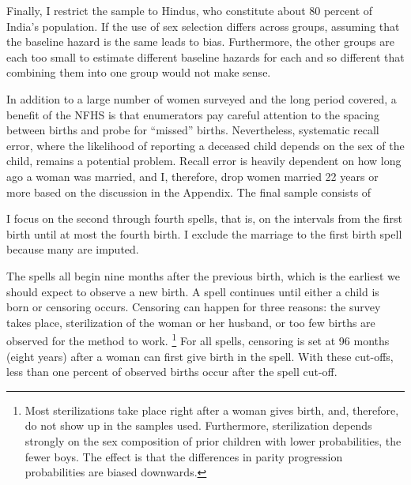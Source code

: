 \documentclass[12pt,letterpaper]{article}
\begin{document}
Finally, I restrict the sample to Hindus, who constitute about 80 percent of India’s 
population.
If the use of sex selection differs across groups, assuming that the
baseline hazard is the same leads to bias. 
Furthermore, the other groups are each too small to estimate different
baseline hazards for each and so different that combining them into one
group would not make sense.


In addition to a large number of women surveyed and the long period covered, a
benefit of the NFHS is that enumerators pay careful attention to the spacing 
between births and probe for ``missed'' births.
Nevertheless, systematic recall error, where the likelihood of reporting a deceased 
child depends on the sex of the child, remains a potential problem.
Recall error is heavily dependent on how long ago a woman was married, and I, therefore, 
drop women married 22 years or more based on the discussion in the Appendix.
The final sample consists of 



I focus on the second through fourth spells, that is, on the intervals from the first 
birth until at most the fourth birth.
I exclude the marriage to the first birth spell because many are imputed.

The spells all begin nine months after the previous birth, which is the earliest we should 
expect to observe a new birth.
A spell continues until either a child is born or censoring occurs.
Censoring can happen for three reasons:
the survey takes place,
sterilization of the woman or her husband,
or too few births are observed for the method to work.%
\footnote{
Most sterilizations take place right after a woman gives birth, and,
therefore, do not show up in the samples used. 
Furthermore, sterilization depends strongly on the sex composition of prior children
with lower probabilities, the fewer boys. 
The effect is that the differences in parity progression probabilities are biased 
downwards.
}
For all spells, censoring is set at 96 months (eight years) after a woman can first
give birth in the spell.
With these cut-offs, less than one percent of observed births occur after
the spell cut-off.

% 
\end{document}
